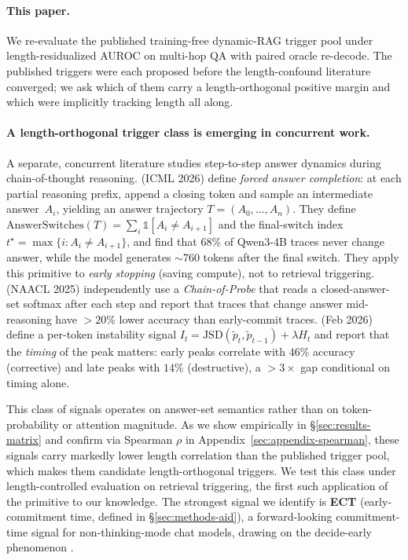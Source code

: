 \documentclass[11pt]{article}
\begin{document}
\paragraph{This paper.} We re-evaluate the published training-free
dynamic-RAG trigger pool under length-residualized AUROC
\citep{Vashurin_UncertaintyLineLengthInvariant} on multi-hop QA with
paired oracle re-decode. The published triggers were each proposed before
the length-confound literature converged; we ask which of them carry a
length-orthogonal positive margin and which were implicitly tracking
length all along.

\paragraph{A length-orthogonal trigger class is emerging in concurrent work.}
A separate, concurrent literature studies step-to-step answer dynamics during
chain-of-thought reasoning. \cite{Datta_DecideEarlyExplainLater} (ICML 2026)
define \emph{forced answer completion}: at each partial reasoning prefix,
append a closing token and sample an intermediate answer~$A_i$, yielding an
answer trajectory $T = (A_0, \ldots, A_n)$. They define
$\mathrm{AnswerSwitches}(T) = \sum_i \mathbb{1}[A_i \neq A_{i+1}]$ and the
final-switch index $t^\star = \max\{i : A_i \neq A_{i+1}\}$, and find that
68\% of Qwen3-4B traces never change answer, while the model generates
$\sim$760 tokens after the final switch. They apply this primitive to
\emph{early stopping} (saving compute), not to retrieval triggering.
\cite{Wang_ChainOfProbeCoTStepByStep} (NAACL 2025) independently
use a \emph{Chain-of-Probe} that reads a closed-answer-set softmax after each
step and report that traces that change answer mid-reasoning have $>20\%$
lower accuracy than early-commit traces.
\cite{Chen_DynamicInstabilityLLMReasoning} (Feb 2026) define a per-token
instability signal $I_t = \mathrm{JSD}(\tilde{p}_t, \tilde{p}_{t-1}) +
\lambda H_t$ and report that the \emph{timing} of the peak matters: early
peaks correlate with $46\%$ accuracy (corrective) and late peaks with $14\%$
(destructive), a $>3\times$ gap conditional on timing alone.

This class of signals operates on answer-set semantics rather than on
token-probability or attention magnitude. As we show empirically in
\S\ref{sec:results-matrix} and confirm via Spearman $\rho$ in
Appendix~\ref{sec:appendix-spearman}, these signals carry markedly lower
length correlation than the published trigger pool, which makes them
candidate length-orthogonal triggers. We test this class under
length-controlled evaluation on retrieval triggering, the first such
application of the primitive to our knowledge. The strongest signal we
identify is \textbf{ECT} (early-commitment time, defined in
\S\ref{sec:methods-aid}), a forward-looking commitment-time signal for
non-thinking-mode chat models, drawing on the decide-early phenomenon
\citep{Datta_DecideEarlyExplainLater, Wang_ChainOfProbeCoTStepByStep,
Chen_DynamicInstabilityLLMReasoning}.
\end{document}
